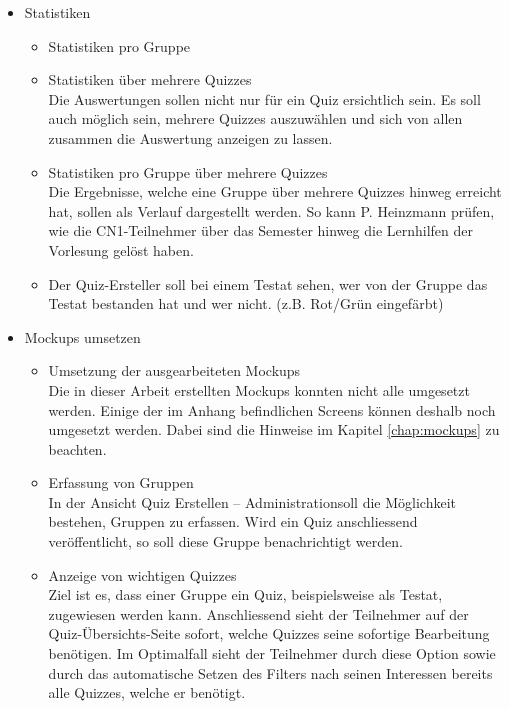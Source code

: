 \begin{itemize}
	
	\item Statistiken
	\begin{itemize}
		\item Statistiken pro Gruppe
		\item Statistiken über mehrere Quizzes \\
		Die Auswertungen sollen nicht nur für ein Quiz ersichtlich sein. Es soll auch möglich sein, mehrere Quizzes auszuwählen und sich von allen zusammen die Auswertung anzeigen zu lassen.
		\item Statistiken pro Gruppe über mehrere Quizzes \\
		Die Ergebnisse, welche eine Gruppe über mehrere Quizzes hinweg erreicht hat, sollen als Verlauf dargestellt werden. So kann P. Heinzmann prüfen, wie die CN1-Teilnehmer über das Semester hinweg die Lernhilfen der Vorlesung gelöst haben.
		\item Der Quiz-Ersteller soll bei einem Testat sehen, wer von der Gruppe das Testat bestanden hat und wer nicht. (z.B. Rot/Grün eingefärbt)
	\end{itemize}
	
	
	\item Mockups umsetzen \\
	\begin{itemize}
		\item Umsetzung der ausgearbeiteten Mockups\\
		Die in dieser Arbeit erstellten Mockups konnten nicht alle umgesetzt werden. Einige der im Anhang befindlichen Screens können deshalb noch umgesetzt werden. Dabei sind die Hinweise im Kapitel \ref{chap:mockups} zu beachten.
		
		\item Erfassung von Gruppen \\
		In der Ansicht \glqq Quiz Erstellen – Administration\grqq soll die Möglichkeit bestehen, Gruppen zu erfassen. Wird ein Quiz anschliessend veröffentlicht, so soll diese Gruppe benachrichtigt werden.
		
		\item Anzeige von wichtigen Quizzes \\
		Ziel ist es, dass einer Gruppe ein Quiz, beispielsweise als Testat, zugewiesen werden kann. Anschliessend sieht der Teilnehmer auf der Quiz-Übersichts-Seite sofort, welche Quizzes seine sofortige Bearbeitung benötigen.
		Im Optimalfall sieht der Teilnehmer durch diese Option sowie durch das automatische Setzen des Filters nach seinen Interessen bereits alle Quizzes, welche er benötigt.
		

\end{itemize}
\end{itemize}
